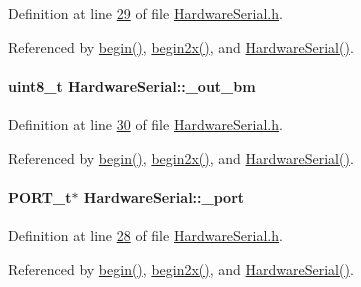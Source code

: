 Definition at line \hyperlink{_hardware_serial_8h_source_l00029}{29} of file \hyperlink{_hardware_serial_8h_source}{HardwareSerial.h}.



Referenced by \hyperlink{_hardware_serial_8cpp_source_l00140}{begin()}, \hyperlink{_hardware_serial_8cpp_source_l00173}{begin2x()}, and \hyperlink{_hardware_serial_8cpp_source_l00112}{HardwareSerial()}.

\hypertarget{class_hardware_serial_a751a284e15af72b026143a8091be1b70}{
\paragraph[{\_\-out\_\-bm}]{\setlength{\rightskip}{0pt plus 5cm}uint8\_\-t {\bf HardwareSerial::\_\-out\_\-bm}}\hfill}
\label{class_hardware_serial_a751a284e15af72b026143a8091be1b70}


Definition at line \hyperlink{_hardware_serial_8h_source_l00030}{30} of file \hyperlink{_hardware_serial_8h_source}{HardwareSerial.h}.



Referenced by \hyperlink{_hardware_serial_8cpp_source_l00140}{begin()}, \hyperlink{_hardware_serial_8cpp_source_l00173}{begin2x()}, and \hyperlink{_hardware_serial_8cpp_source_l00112}{HardwareSerial()}.

\hypertarget{class_hardware_serial_add54c7d986c6122e8e8c23303f5b4845}{
\paragraph[{\_\-port}]{\setlength{\rightskip}{0pt plus 5cm}PORT\_\-t$\ast$ {\bf HardwareSerial::\_\-port}}\hfill}
\label{class_hardware_serial_add54c7d986c6122e8e8c23303f5b4845}


Definition at line \hyperlink{_hardware_serial_8h_source_l00028}{28} of file \hyperlink{_hardware_serial_8h_source}{HardwareSerial.h}.



Referenced by \hyperlink{_hardware_serial_8cpp_source_l00140}{begin()}, \hyperlink{_hardware_serial_8cpp_source_l00173}{begin2x()}, and \hyperlink{_hardware_serial_8cpp_source_l00112}{HardwareSerial()}.

